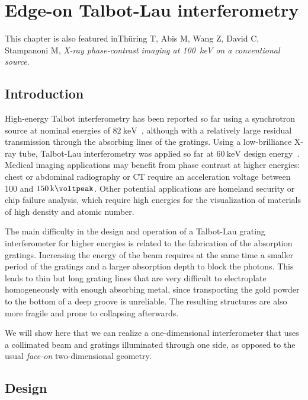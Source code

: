 \chapter{Edge-on Talbot-Lau interferometry}\label{ch:edgeon} %
This chapter is also featured in\cn Th\"uring T, Abis M, Wang Z, David C,
Stampanoni M, \emph{X-ray phase-contrast imaging at \SI{100}{\kilo\eV} on a
conventional source}.

\section{Introduction}
High-energy Talbot interferometry has been reported so far using a
synchrotron source at nominal energies of
$\SI{82}{\kilo\electronvolt}$~\cite{Willner2013}, although with a relatively
large residual transmission through the absorbing lines of the gratings.
Using a low-brilliance X-ray tube, Talbot-Lau interferometry was applied so
far at $\SI{60}{\kilo\electronvolt}$ design energy~\cite{Donath2009a}.
Medical imaging applications may benefit from phase contrast at higher
energies: chest or abdominal radiography or \ac{CT} require an acceleration
voltage between \num{100} and $\SI{150}{\kilo\voltpeak}$. Other potential
applications are homeland security or chip failure analysis, which require
high energies for the visualization of materials of high density and atomic
number.

The main difficulty in the design and operation of a Talbot-Lau grating
interferometer for higher energies is related to the fabrication of the
absorption gratings. Increasing the energy of the beam requires at the same
time a smaller period of the gratings and a larger absorption depth to block
the photons. This leads to thin but long grating lines that are very
difficult to electroplate homogeneously with enough absorbing metal, since
transporting the gold powder to the bottom of a deep groove is unreliable.
The resulting structures are also more fragile and prone to collapsing
afterwards.

We will show here that we can realize a one-dimensional interferometer that
uses a collimated beam and gratings illuminated through one side, as opposed
to the usual \emph{face-on} two-dimensional geometry.

\section{Design}
